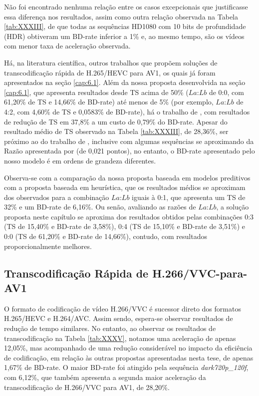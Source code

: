Não foi encontrado nenhuma relação entre os casos excepcionais que justificasse essa diferença nos resultados, assim como outra relação observada na Tabela \ref{tab:XXXIII}, de que todas as sequências HD1080 com 10 bits de profundidade (HDR) obtiveram um BD-rate inferior a 1\% e, ao mesmo tempo, são os vídeos com menor taxa de aceleração observada.

Há, na literatura científica, outros trabalhos que propõem soluções de transcodificação rápida de H.265/HEVC para AV1, os quais já foram apresentados na seção \ref{cap:6.1}. Além da nossa proposta desenvolvida na seção \ref{cap:6.1}, que apresenta resultados desde TS acima de 50\% ($La$:$Lb$ de 0:0, com 61,20\% de TS e 14,66\% de BD-rate) até menos de 5\% (por exemplo, $La$:$Lb$ de 4:2, com 4,60\% de TS e 0,0583\% de BD-rate), há o trabalho de \citet{bib:chen_2019}, com resultados de redução de TS em 37,8\% a um custo de 0,79\% do BD-rate. Apesar do resultado médio de TS observado na Tabela \ref{tab:XXXIII}, de 28,36\%, ser próximo ao do trabalho de \citet{bib:chen_2019}, inclusive com algumas sequências se aproximando da Razão apresentada por \citeauthor{bib:chen_2019} (de 0,021 pontos), no entanto, o BD-rate apresentado pelo nosso modelo é em ordens de grandeza diferentes.

Observa-se com a comparação da nossa proposta baseada em modelos preditivos com a proposta baseada em heurística, que os resultados médios se aproximam dos observados para a combinação $La$:$Lb$ iguais à 0:1, que apresenta um TS de 32\% e um BD-rate de 6,16\%. Ou senão, avaliando as razões de $La$:$Lb$, a solução proposta neste capítulo se aproxima dos resultados obtidos pelas combinações 0:3 (TS de 15,40\% e BD-rate de 3,58\%), 0:4 (TS de 15,10\% e BD-rate de 3,51\%) e 0:0 (TS de 61,20\% e BD-rate de 14,66\%), contudo, com resultados proporcionalmente melhores.

\subsection{Transcodificação Rápida de H.266/VVC-para-AV1}
\label{cap:7.5.5}

O formato de codificação de vídeo H.266/VVC é sucessor direto dos formatos H.265/HEVC e H.264/AVC. Assim sendo, espera-se observar resultados de redução de tempo similares. No entanto, ao observar os resultados de transcodificação na Tabela \ref{tab:XXXV}, notamos uma aceleração de apenas 12,05\%, mas acompanhado de uma redução considerável no impacto da eficiência de codificação, em relação às outras propostas apresentadas nesta tese, de apenas 1,67\% de BD-rate. O maior BD-rate foi atingido pela sequência \textit{dark720p\_120f}, com 6,12\%, que também apresenta a segunda maior aceleração da transcodificação de H.266/VVC para AV1, de 28,20\%.

